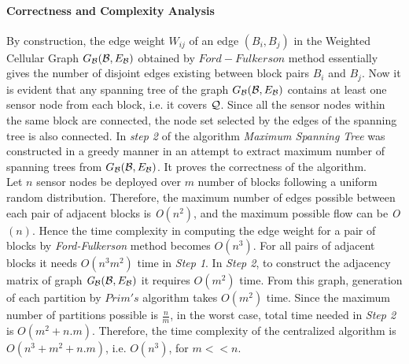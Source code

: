 \documentclass{acm_proc_article-sp}
\begin{document}
 \paragraph{\bf Correctness and Complexity Analysis} 
 By construction, the edge weight $W_{ij}$ of an edge $(B_i, B_j)$ in the Weighted Cellular Graph $G_{\cal B}({\cal B},E_{\cal B})$ obtained by $Ford-Fulkerson$ method essentially gives the number of disjoint edges existing between block pairs $B_i$ and $B_j$. Now it is evident that any spanning tree of the graph $G_{\cal B}({\cal B},E_{\cal B})$ contains at least one sensor node from each block, i.e. it covers ${\cal Q}$. Since all the sensor nodes within the same block are connected, the node set selected by the edges of the spanning tree is also connected. In {\it step 2} of the algorithm {\it Maximum Spanning Tree} was constructed in a greedy manner in an attempt to extract maximum number of spanning trees from $G_{\cal B}({\cal B},E_{\cal B})$. It proves the correctness of the algorithm. \\ 
 Let $n$ sensor nodes be deployed over $m$ number of blocks following a uniform random distribution. Therefore, the maximum number of edges possible between each pair of adjacent blocks is {\it O}$(n^2)$, and the maximum possible flow can be {\it O}$(n)$. Hence the time complexity in computing the edge weight for a pair of blocks by {\it Ford-Fulkerson} method becomes $O(n^3)$. For all pairs of adjacent blocks it needs $O(n^{3}m^{2})$ time in {\it Step 1}. In {\it Step 2}, to construct the adjacency matrix of graph ${{\it G}}_{\cal B}({\cal B},E_{\cal B})$ it requires $O(m^2)$ time. From this graph, generation of each partition by $Prim's$ algorithm takes $O(m^2)$ time. Since the maximum number of partitions possible is $\frac{ n}{m}$, in the worst case, total time needed in {\it Step 2} is $O(m^2+n.m)$.
 Therefore, the time complexity of the centralized algorithm is $O( n^3+ m^2+ n.m)$, i.e. $O( n^3)$, for $m<<n$.
\vspace{-0.3cm}
\end{document}
